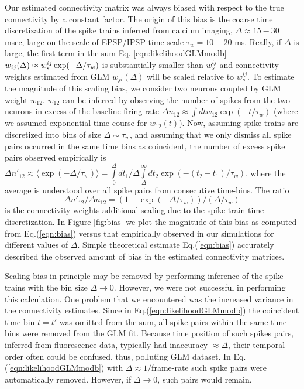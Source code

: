Our estimated connectivity matrix was always biased with respect to the true connectivity by a constant factor. The origin of this bias is the coarse time discretization of the spike trains inferred from calcium imaging, $\Delta \approx 15-30$ msec, large on the scale of EPSP/IPSP time scale $\tau_w = 10-20$ ms. Really, if $\Delta$ is large, the first term in the sum Eq. \eqref{eqn:likelihoodGLMmodb} $w_{ij}(\Delta)\approx w^{ij}_s\exp(-\Delta/\tau_w)$ is substantially smaller than $w^{ij}_s$ and connectivity weights estimated from GLM $w_{ji}(\Delta)$ will be scaled relative to $w_s^{ij}$.
To estimate the magnitude of this scaling bias, we consider two neurons coupled by GLM weight $w_{12}$. $w_{12}$ can be inferred by observing the number of spikes from the two neurons in excess of the baseline firing rate $\Delta n_{12} \approx \int dt w_{12} \exp(-t/\tau_w)$ (where we assumed exponential time course for $w_{12}(t)$). Now, assuming spike trains are discretized into bins of size $\Delta \sim \tau_w$, and assuming that we only dismiss all spike pairs occurred in the same time bins as coincident, the number of excess spike pairs observed empirically is $\Delta n'_{12} \approx \langle \exp(-\Delta/\tau_w) \rangle = \int\limits_0^\Delta {dt_1}/{\Delta} \int\limits_{\Delta}^\infty dt_2 \exp(-(t_2-t_1)/\tau_w)$, where the average is understood over all spike pairs from consecutive time-bins. The ratio
\begin{equation}\label{eqn:bias}
\Delta n'_{12}/\Delta n_{12}=(1-\exp(-\Delta/\tau_w))/(\Delta/\tau_w)
\end{equation}
is the connectivity weights additional scaling due to the spike train time-discretization. In Figure \ref{fig:bias} we plot the magnitude of this bias as computed from Eq.(\ref{eqn:bias}) versus that empirically observed in our simulations for different values of $\Delta$. Simple theoretical estimate Eq.(\ref{eqn:bias}) accurately described the observed amount of bias in the estimated connectivity matrices.

Scaling bias in principle may be removed by performing inference of the spike trains with the bin size $\Delta \rightarrow 0$.
However, we were not successful in performing this calculation.
One problem that we encountered was the increased variance in the connectivity estimates.
Since in Eq.(\ref{eqn:likelihoodGLMmodb}) the coincident time bin $t=t'$ was omitted from the sum, all spike pairs within the same time-bins were removed from the GLM fit.  Because time position of such spikes pairs, inferred from fluorescence data, typically had inaccuracy $\approx \Delta$, their temporal order often could be confused, thus, polluting GLM dataset. In Eq.(\ref{eqn:likelihoodGLMmodb}) with $\Delta \approx 1/$frame-rate such spike pairs were automatically removed. However, if $\Delta \rightarrow 0$, such pairs would remain.

